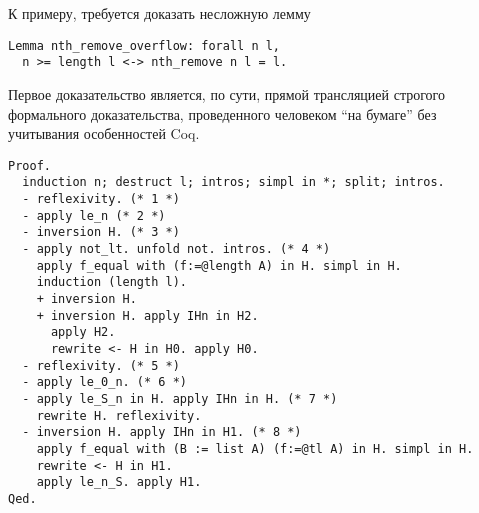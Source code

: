 К примеру, требуется доказать несложную лемму
\begin{lstlisting}
Lemma nth_remove_overflow: forall n l,
  n >= length l <-> nth_remove n l = l.
\end{lstlisting}

Первое доказательство является, по сути, прямой трансляцией строгого формального доказательства, проведенного человеком ``на бумаге'' без учитывания особенностей Coq.
\begin{lstlisting}
Proof.
  induction n; destruct l; intros; simpl in *; split; intros.
  - reflexivity. (* 1 *)
  - apply le_n (* 2 *)
  - inversion H. (* 3 *)
  - apply not_lt. unfold not. intros. (* 4 *)
    apply f_equal with (f:=@length A) in H. simpl in H.
    induction (length l).
    + inversion H.
    + inversion H. apply IHn in H2.
      apply H2.
      rewrite <- H in H0. apply H0.
  - reflexivity. (* 5 *)
  - apply le_0_n. (* 6 *)
  - apply le_S_n in H. apply IHn in H. (* 7 *)
    rewrite H. reflexivity.
  - inversion H. apply IHn in H1. (* 8 *)
    apply f_equal with (B := list A) (f:=@tl A) in H. simpl in H.
    rewrite <- H in H1.
    apply le_n_S. apply H1.
Qed.
\end{lstlisting}

